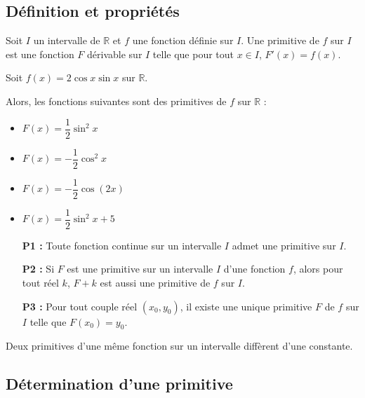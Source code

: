 
\everymath{\displaystyle}



\subsection{Définition et propriétés}

\begin{definition}
Soit $I$ un intervalle de $\mathbb{R}$ et $f$ une fonction définie sur $I$. Une primitive de $f$ sur $I$ est une fonction $F$ dérivable sur $I$ telle que pour tout $x \in I$, $F'(x) = f(x)$.
\end{definition}

\begin{example}
Soit $f(x) = 2\cos x \sin x$ sur $\mathbb{R}$.

Alors, les fonctions suivantes sont des primitives de $f$ sur $\mathbb{R}$ :
\begin{itemize}
  \item $F(x) = \dfrac{1}{2} \sin^2 x$
  \item $F(x) = -\dfrac{1}{2} \cos^2 x$
  \item $F(x) = -\dfrac{1}{2} \cos(2x)$
  \item $F(x) = \dfrac{1}{2} \sin^2 x + 5$
\end{itemize}
\end{example}

\begin{property}
\begin{itemize}
  \item[\textbf{P1 :}] Toute fonction continue sur un intervalle $I$ admet une primitive sur $I$.
  \item[\textbf{P2 :}] Si $F$ est une primitive sur un intervalle $I$ d’une fonction $f$, alors pour tout réel $k$, $F + k$ est aussi une primitive de $f$ sur $I$.
  \item[\textbf{P3 :}] Pour tout couple réel $(x_0, y_0)$, il existe une unique primitive $F$ de $f$ sur $I$ telle que $F(x_0) = y_0$.
\end{itemize}
\end{property}
\medskip


\begin{remark}
 Deux primitives d’une même fonction sur un intervalle diffèrent d’une constante.
\end{remark}
\subsection{Détermination d’une primitive}

